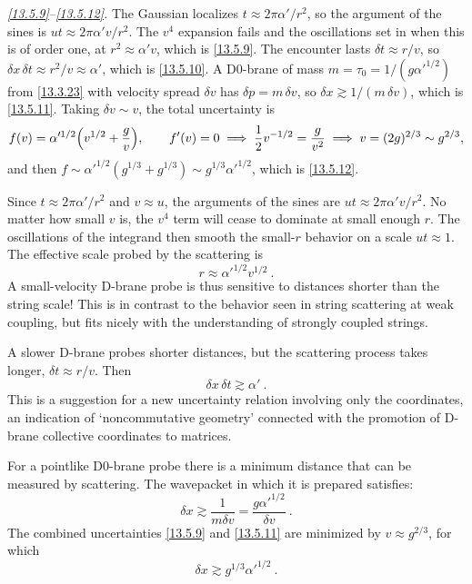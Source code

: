 \begin{tcolorbox}[breakable]
\begin{remark}
		\textit{\eqref{13.5.9}--\eqref{13.5.12}.} The Gaussian localizes $t\approx2\pi\alpha'/r^2$, so the argument of the sines is $ut\approx2\pi\alpha'v/r^2$. The $v^4$ expansion fails and the oscillations set in when this is of order one, at $r^2\approx\alpha'v$, which is \eqref{13.5.9}. The encounter lasts $\delta t\approx r/v$, so $\delta x\,\delta t\approx r^2/v\approx\alpha'$, which is \eqref{13.5.10}. A D0-brane of mass $m=\tau_0=1/(g\alpha'^{1/2})$ from \eqref{13.3.23} with velocity spread $\delta v$ has $\delta p=m\,\delta v$, so $\delta x\gtrsim1/(m\,\delta v)$, which is \eqref{13.5.11}. Taking $\delta v\sim v$, the total uncertainty is
		\begin{equation*}
			f(v) = \alpha'^{1/2}\Bigl(v^{1/2}+\frac gv\Bigr),\qquad f'(v)=0 \;\Longrightarrow\; \frac12v^{-1/2}=\frac g{v^2} \;\Longrightarrow\; v=(2g)^{2/3}\sim g^{2/3},
		\end{equation*}
		and then $f\sim\alpha'^{1/2}(g^{1/3}+g^{1/3})\sim g^{1/3}\alpha'^{1/2}$, which is \eqref{13.5.12}.
	\end{remark}
\end{tcolorbox}
Since $t \approx 2\pi\alpha'/r^2$ and $v \approx u$, the arguments of the sines are $u t \approx 2\pi\alpha' v/r^2$. No matter how small $v$ is, the $v^4$ term will cease to dominate at small enough $r$. The oscillations of the integrand then smooth the small-$r$ behavior on a scale $u t \approx 1$. The effective scale probed by the scattering is
\begin{equation}
	r \approx \alpha'^{1/2}v^{1/2} \:. \label{13.5.9}
\end{equation}
A small-velocity D-brane probe is thus sensitive to distances shorter than the string scale! This is in contrast to the behavior seen in string scattering at weak coupling, but fits nicely with the understanding of strongly coupled strings.

A slower D-brane probes shorter distances, but the scattering process takes longer, $\delta t \approx r/v$. Then
\begin{equation}
	\delta x\,\delta t \gtrsim \alpha' \:. \label{13.5.10}
\end{equation}
This is a suggestion for a new uncertainty relation involving only the coordinates, an indication of `noncommutative geometry' connected with the promotion of D-brane collective coordinates to matrices.

For a pointlike D0-brane probe there is a minimum distance that can be measured by scattering. The wavepacket in which it is prepared satisfies:
\begin{equation}
	\delta x \gtrsim \frac{1}{m\delta v} = \frac{g\alpha'^{1/2}}{\delta v} \:. \label{13.5.11}
\end{equation}
The combined uncertainties \eqref{13.5.9} and \eqref{13.5.11} are minimized by $v \approx g^{2/3}$, for which
\begin{equation}
	\delta x \gtrsim g^{1/3}\alpha'^{1/2} \:. \label{13.5.12}
\end{equation}

